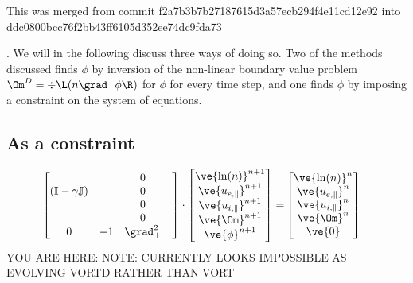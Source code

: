 This was merged from commit
f2a7b3b7b27187615d3a57ecb294f4e11cd12e92
into
ddc0800bcc76f2bb43ff6105d352ee74dc9fda73

. We will in the following discuss three ways of doing so.
Two of the methods discussed finds $\phi$ by inversion of the non-linear
boundary value problem $\Om^D = \div\L(n\grad_\perp\phi\R)$ for $\phi$ for
every time step, and one finds $\phi$ by imposing a constraint on the system of
equations.



\subsection{As a constraint}
%
\begin{align*}
    \begin{bmatrix}
                                        & & 0  \\
        (\mathbb{I} - \gamma\mathbb{J}) & & 0  \\
                                        & & 0  \\
                                        & & 0  \\
        0                               & -1 & \grad_\perp^2 & \\
    \end{bmatrix}
    \cdot
    \begin{bmatrix}
        \ve{\ln(n)}^{n+1}  \\
        \ve{u_{e,\|}}^{n+1}\\
        \ve{u_{i,\|}}^{n+1}\\
        \ve{\Om}^{n+1}     \\
        \ve{\phi}^{n+1}    \\
    \end{bmatrix}
    =&
    \begin{bmatrix}
        \ve{\ln(n)}^{n}  \\
        \ve{u_{e,\|}}^{n}\\
        \ve{u_{i,\|}}^{n}\\
        \ve{\Om}^{n}     \\
        \ve{0}           \\
    \end{bmatrix}
\end{align*}
%
YOU ARE HERE:
NOTE: CURRENTLY LOOKS IMPOSSIBLE AS EVOLVING VORTD RATHER THAN VORT
